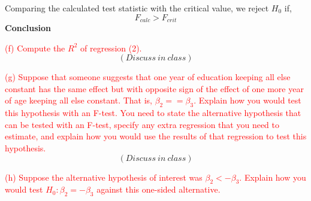 \documentclass[12pt]{report}
\begin{document}
\noindent Comparing the calculated test statistic with the critical value, we reject $H_0$ if,
$$F_{calc} > F_{crit}$$
\noindent \textbf{Conclusion}


\noindent \textcolor{red}{(f) Compute the $R^2$ of regression (2).} $$(Discuss\ in\ class)$$

\noindent \textcolor{red}{(g) Suppose that someone suggests that one year of education keeping all else constant has the same effect but with opposite sign of the effect of one more year of age keeping all else constant. That is, $\beta_2 = =\beta_3$. Explain how you would test this hypothesis with an F-test. You need to state the alternative hypothesis that can be tested with an F-test, specify any extra regression that you need to estimate, and explain how you would use the results of that regression to test this hypothesis.} $$(Discuss\ in\ class)$$

\noindent \textcolor{red}{(h) Suppose the alternative hypothesis of interest was $\beta_2 < -\beta_3$. Explain how you would test $H_0: \beta_2 = -\beta_3$ against this one-sided alternative.}
\end{document}
